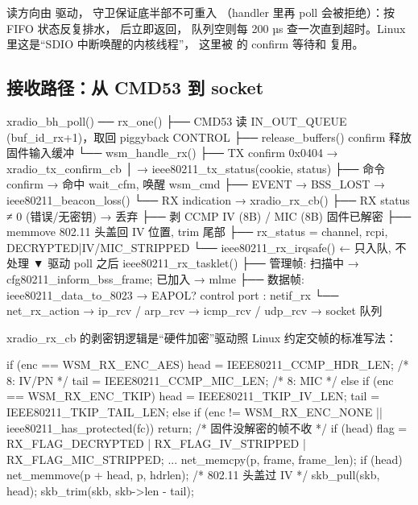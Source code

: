 读方向由  驱动， 守卫保证底半部不可重入
（handler 里再 poll 会被拒绝）：按 FIFO 状态反复排水， 后立即返回，
队列空则每 200 µs 查一次直到超时。Linux 里这是``SDIO 中断唤醒的内核线程''，
这里被  的 confirm 等待和  复用。

\subsection{接收路径：从 CMD53 到 socket}

\begin{txtcode}
xradio_bh_poll() ── rx_one()
  ├── CMD53 读 IN_OUT_QUEUE (buf_id_rx+1)，取回 piggyback CONTROL
  ├── release_buffers()          confirm 释放固件输入缓冲
  └── wsm_handle_rx()
        ├── TX confirm 0x0404 → xradio_tx_confirm_cb
        │                      → ieee80211_tx_status(cookie, status)
        ├── 命令 confirm     → 命中 wait_cfm, 唤醒 wsm_cmd
        ├── EVENT            → BSS_LOST → ieee80211_beacon_loss()
        └── RX indication    → xradio_rx_cb()
              ├── RX status ≠ 0 (错误/无密钥) → 丢弃
              ├── 剥 CCMP IV (8B) / MIC (8B)   固件已解密
              ├── memmove 802.11 头盖回 IV 位置, trim 尾部
              ├── rx_status = { channel, rcpi, DECRYPTED|IV/MIC_STRIPPED }
              └── ieee80211_rx_irqsafe()   ← 只入队, 不处理
                                            ▼ 驱动 poll 之后
ieee80211_rx_tasklet()
  ├── 管理帧: 扫描中 → cfg80211_inform_bss_frame; 已加入 → mlme
  ├── 数据帧: ieee80211_data_to_8023 → EAPOL? control port : netif_rx
  └── net_rx_action → ip_rcv / arp_rcv → icmp_rcv / udp_rcv → socket 队列
\end{txtcode}

xradio\_rx\_cb 的剥密钥逻辑是``硬件加密''驱动照 Linux 约定交帧的标准写法：

\begin{ccode}
if (enc == WSM_RX_ENC_AES) {
    head = IEEE80211_CCMP_HDR_LEN;      /* 8: IV/PN */
    tail = IEEE80211_CCMP_MIC_LEN;      /* 8: MIC */
} else if (enc == WSM_RX_ENC_TKIP) {
    head = IEEE80211_TKIP_IV_LEN;
    tail = IEEE80211_TKIP_TAIL_LEN;
} else if (enc != WSM_RX_ENC_NONE || ieee80211_has_protected(fc)) {
    return;                             /* 固件没解密的帧不收 */
}
if (head)
    flag = RX_FLAG_DECRYPTED | RX_FLAG_IV_STRIPPED | RX_FLAG_MIC_STRIPPED;
...
net_memcpy(p, frame, frame_len);
if (head) {
    net_memmove(p + head, p, hdrlen);   /* 802.11 头盖过 IV */
    skb_pull(skb, head);
    skb_trim(skb, skb->len - tail);
}
\end{ccode}


